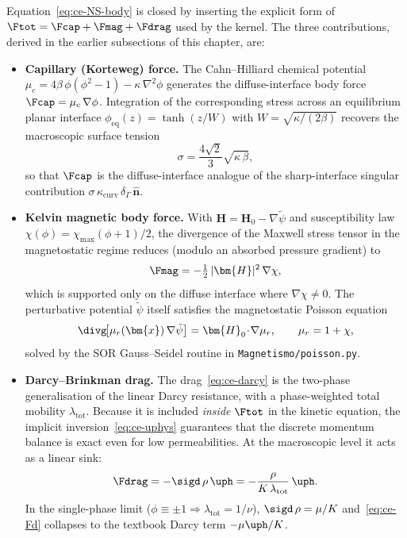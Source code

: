 Equation~\eqref{eq:ce-NS-body} is closed by inserting the explicit form of $\Ftot = \Fcap + \Fmag + \Fdrag$ used by the kernel.
The three contributions, derived in the earlier subsections of this chapter, are:
\begin{itemize}
    \item \textbf{Capillary (Korteweg) force.} The Cahn--Hilliard chemical potential $\mu_c = 4\beta\,\phi(\phi^{2}-1) - \kappa\,\nabla^{2}\phi$ generates the diffuse-interface body force $\Fcap = \mu_c\,\nabla\phi$.
    Integration of the corresponding stress across an equilibrium planar interface $\phi_{\mathrm{eq}}(z) = \tanh(z/W)$ with $W = \sqrt{\kappa/(2\beta)}$ recovers the macroscopic surface tension
    \begin{equation}
    \sigma = \frac{4\sqrt{2}}{3}\sqrt{\kappa\,\beta},
    \label{eq:ce-sigma}
    \end{equation}
    so that $\Fcap$ is the diffuse-interface analogue of the sharp-interface singular contribution $\sigma\,\kappa_{\mathrm{curv}}\,\delta_\Gamma\,\hat{\bm{n}}$.
    \item \textbf{Kelvin magnetic body force.} With $\bm{H} = \bm{H}_0 - \nabla\tilde{\psi}$ and susceptibility law $\chi(\phi) = \chi_{\max}(\phi+1)/2$, the divergence of the Maxwell stress tensor in the magnetostatic regime reduces (modulo an absorbed pressure gradient) to
    \begin{equation}
    \Fmag = -\tfrac{1}{2}\,|\bm{H}|^{2}\,\nabla\chi,
    \label{eq:ce-Fm}
    \end{equation}
    which is supported only on the diffuse interface where $\nabla\chi \neq 0$.
    The perturbative potential $\tilde{\psi}$ itself satisfies the magnetostatic Poisson equation
    \begin{equation}
    \divg\!\bigl[\mu_r(\bm{x})\,\nabla\tilde{\psi}\bigr] = \bm{H}_0\!\cdot\!\nabla\mu_r,\qquad \mu_r = 1 + \chi,
    \label{eq:ce-poisson}
    \end{equation}
    solved by the SOR Gauss--Seidel routine in \texttt{Magnetismo/poisson.py}.
    \item \textbf{Darcy--Brinkman drag.} The drag~\eqref{eq:ce-darcy} is the two-phase generalisation of the linear Darcy resistance, with a phase-weighted total mobility $\lambda_{\mathrm{tot}}$.
    Because it is included \emph{inside} $\Ftot$ in the kinetic equation, the implicit inversion~\eqref{eq:ce-uphys} guarantees that the discrete momentum balance is exact even for low permeabilities.
    At the macroscopic level it acts as a linear sink:
    \begin{equation}
    \Fdrag = -\sigd\,\rho\,\uph = -\frac{\rho}{K\,\lambda_{\mathrm{tot}}}\,\uph.
    \label{eq:ce-Fd}
    \end{equation}
    In the single-phase limit ($\phi \equiv \pm 1 \Rightarrow \lambda_{\mathrm{tot}} = 1/\nu$), $\sigd\,\rho = \mu/K$ and~\eqref{eq:ce-Fd} collapses to the textbook Darcy term $-\mu\uph/K$.
\end{itemize}

